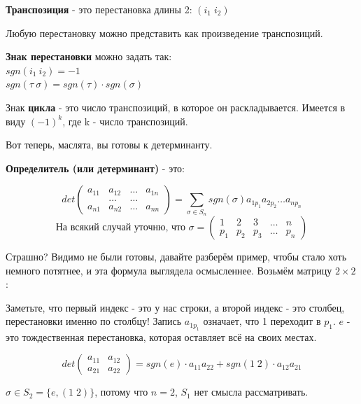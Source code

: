 \documentclass[12pt]{article}
\begin{document}
\begin{definitionbox}
    \textbf{Транспозиция} - это перестановка длины 2: $(i_1\;i_2)$ 
\end{definitionbox}

\begin{theorembox}
    Любую перестановку можно представить как произведение транспозиций.
\end{theorembox}

\begin{definitionbox}
    \textbf{Знак перестановки} можно задать так:\\
    $sgn(i_1\ i_2) = -1$\\
    $sgn(\tau \ \sigma) = sgn(\tau) \cdot sgn(\sigma)$
\end{definitionbox}

\begin{remarkbox}
    Знак \textbf{цикла} - это число транспозиций, в которое он раскладывается. Имеется в виду $(-1)^k$, где k - число транспозиций.
\end{remarkbox}

Вот теперь, маслята, вы готовы к детерминанту.

\begin{definitionbox}
    \textbf{Определитель (или детерминант)} - это:

    \[
        det \begin{pmatrix}
            a_{11} & a_{12} & \dots &a_{1n}\\
            &\dots & \dots \\
            a_{n1} & a_{n2} & \dots & a_{nn}
        \end{pmatrix} = \sum_{\sigma \in S_n} sgn(\sigma) a_{1p_1} a_{2p_2} \dots a_{np_n}
    \]
    \[ \text{На всякий случай уточню, что }
    \sigma = \begin{pmatrix}
        1 & 2 & 3 & \dots & n\\
        p_1 & p_2 & p_3 & \dots & p_n
    \end{pmatrix}
    \]
\end{definitionbox}

Страшно? Видимо не были готовы, давайте разберём пример, чтобы стало хоть немного потятнее, и эта формула выглядела осмысленнее. Возьмём матрицу $2\times 2$:

\begin{examplebox}
    Заметьте, что первый индекс - это у нас строки, а второй индекс - это столбец, перестановки именно по столбцу! Запись $a_{1p_1}$ означает, что 1 переходит в $p_1$. $e$ - это тождественная перестановка, которая оставляет всё на своих местах.

    \[
    det\begin{pmatrix}
        a_{11} & a_{12} \\
        a_{21} & a_{22}
    \end{pmatrix} = sgn(e) \cdot a_{11} a_{22} + sgn(1\;2) \cdot a_{12} a_{21}
    \]

    $\sigma \in S_2 = \{e, (1\;2)\}$, потому что $n = 2$, $S_1$ нет смысла рассматривать.
\end{examplebox}
\end{document}
